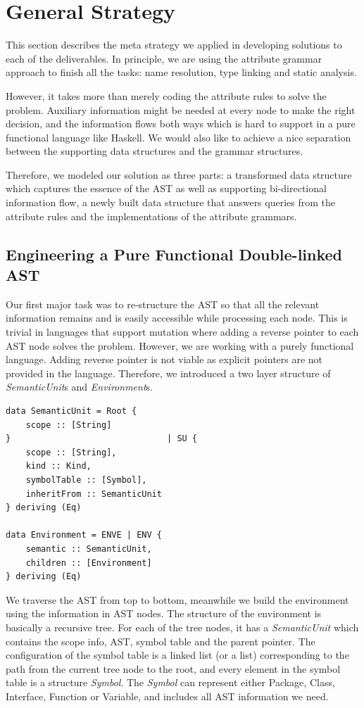 \documentclass[12pt,letterpaper]{article}
\begin{document}
\section{General Strategy}
This section describes the meta strategy we applied in developing solutions to each of the deliverables. In principle, we are using the attribute grammar approach to finish all the tasks: name resolution, type linking and static analysis.

However, it takes more than merely coding the attribute rules to solve the problem. Auxiliary information might be needed at every node to make the right decision, and the information flows both ways which is hard to support in a pure functional language like Haskell. We would also like to achieve a nice separation between the supporting data structures and the grammar structures.

Therefore, we modeled our solution as three parts: a transformed data structure which captures the essence of the AST as well as supporting bi-directional information flow, a newly built data structure that answers queries from the attribute rules and the implementations of the attribute grammars.

\subsection{Engineering a Pure Functional Double-linked AST}
Our first major task was to re-structure the AST so that all the relevant information remains and is easily accessible while processing each node. This is trivial in languages that support mutation where adding a reverse pointer to each AST node solves the problem. However, we are working with a purely functional language. Adding reverse pointer is not viable as explicit pointers are not provided in the language. Therefore, we introduced a two layer structure of \emph{SemanticUnit}s and \emph{Environment}s.
\begin{lstlisting}
data SemanticUnit = Root {
    scope :: [String]
}                               | SU {
    scope :: [String],
    kind :: Kind,
    symbolTable :: [Symbol],
    inheritFrom :: SemanticUnit
} deriving (Eq)

data Environment = ENVE | ENV {
    semantic :: SemanticUnit,
    children :: [Environment]
} deriving (Eq)
\end{lstlisting}

We traverse the AST from top to bottom, meanwhile we build the environment using the information in AST nodes.
The structure of the environment is basically a recursive tree.
For each of the tree nodes, it has a \emph{SemanticUnit} which contains the scope info, AST, symbol table and the parent pointer.
The configuration of the symbol table is a linked list (or a list) corresponding to the path from the current tree node to the root, and every element in the symbol table is a structure \emph{Symbol}.
The \emph{Symbol} can represent either Package, Class, Interface, Function or Variable, and includes all AST information we need.
\end{document}
